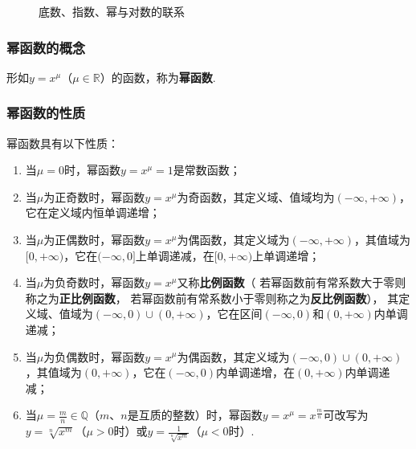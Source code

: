 \begin{figure}[ht]
\centering
{}
\caption{底数、指数、幂与对数的联系}
\label{figure:函数.底数、指数、幂与对数的联系}
\end{figure}

\subsubsection{幂函数的概念}
\begin{definition}[幂函数]
形如\(y=x^{\mu}\)（\(\mu \in \mathbb{R}\)）的函数，称为\textbf{幂函数}.
\end{definition}

\subsubsection{幂函数的性质}
\begin{property}
幂函数具有以下性质：
\begin{enumerate}
\item 当\(\mu = 0\)时，幂函数\(y=x^{\mu}=1\)是常数函数；
\item 当\(\mu\)为正奇数时，幂函数\(y=x^{\mu}\)为奇函数，其定义域、值域均为\((-\infty,+\infty)\)，它在定义域内恒单调递增；
\item 当\(\mu\)为正偶数时，幂函数\(y=x^{\mu}\)为偶函数，其定义域为\((-\infty,+\infty)\)，其值域为\([0,+\infty)\)，它在\((-\infty,0]\)上单调递减，在\([0,+\infty)\)上单调递增；
\item 当\(\mu\)为负奇数时，幂函数\(y=x^{\mu}\)又称\textbf{比例函数}（%
若幂函数前有常系数大于零则称之为\textbf{正比例函数}，%
若幂函数前有常系数小于零则称之为\textbf{反比例函数}），%
其定义域、值域为\((-\infty,0)\cup(0,+\infty)\)，它在区间\((-\infty,0)\)和\((0,+\infty)\)内单调递减；
\item 当\(\mu\)为负偶数时，幂函数\(y=x^{\mu}\)为偶函数，其定义域为\((-\infty,0)\cup(0,+\infty)\)，其值域为\((0,+\infty)\)，它在\((-\infty,0)\)内单调递增，在\((0,+\infty)\)内单调递减；
\item 当\(\mu = \frac{m}{n} \in \mathbb{Q}\)（\(m\)、\(n\)是互质的整数）时，幂函数\(y=x^{\mu}=x^{\frac{m}{n}}\)可改写为\(y=\sqrt[n]{x^m}\)（\(\mu>0\)时）或\(y=\frac{1}{\sqrt[n]{x^m}}\)（\(\mu<0\)时）.
\end{enumerate}
\end{property}

